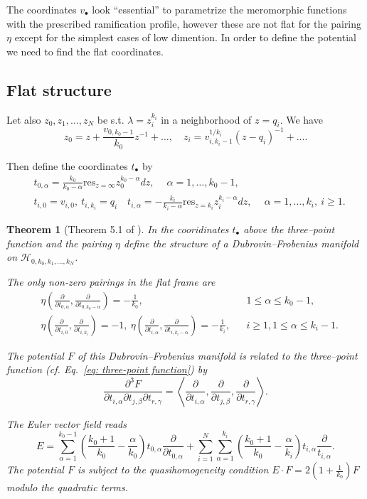 \documentclass[12pt,a4paper]{amsart}
\def\H{{\mathcal H}}
\def\res{{\mathrm{res}}}
\newcommand{\p}{{\partial}}
\newcommand{\<}{\left<}
\renewcommand{\>}{\right>}
\newtheorem{theorem}{Theorem}[section]
\numberwithin{equation}{section}
\begin{document}
The coordinates $v_\bullet$ look ``essential'' to parametrize the meromorphic functions with the prescribed ramification profile, however these are not flat for the pairing $\eta$ except for the simplest cases of low dimention. In order to define the potential we need to find the flat coordinates.

\subsection{Flat structure}\label{section: flat structure}

Let also $z_0,z_1,\dots,z_N$ be s.t. $\lambda = z_i^{k_i}$ in a neighborhood of $z = q_i$. We have
\[
  z_0 = z + \frac{v_{0,k_0-1}}{k_0} z^{-1} + \dots, \quad z_i = v_{i,k_i-1}^{1/k_i} (z - q_i)^{-1} + \dots.
\]

Then define the coordinates $t_\bullet$ by
\begin{align}
    &t_{0,\alpha} = \frac{k_0}{k_0-\alpha} \res_{z = \infty} z_0^{k_0-\alpha} dz,\
    \quad \alpha = 1,\dots,k_0-1,
    \label{eq: flat coordinates 0}
    \\
    &t_{i,0} = v_{i,0}, \ t_{i,k_i} = q_i \quad 
    t_{i,\alpha} = - \frac{k_i}{k_i-\alpha} \res_{z = k_i} z_i^{k_i-\alpha} dz,\
    \quad \alpha = 1,\dots,k_i, \ i \ge 1.
    \label{eq: flat coordinates i}
\end{align}

\begin{theorem}[Theorem 5.1 of \cite{D2}]
    In the cooridinates $t_\bullet$ above the three--point function and the pairing $\eta$ define the structure of a Dubrovin--Frobenius manifold on $\H_{0,k_0,k_1,\dots,k_N}$.
    
    The only non-zero pairings in the flat frame are
    \begin{align*}
        & \eta(\frac{\p}{\p t_{0,\alpha}},\frac{\p}{\p t_{0,k_0-\alpha}}) = -\frac{1}{k_0}, && 1 \le \alpha \le k_0-1,
        \\
        &\eta(\frac{\p}{\p t_{i,0}},\frac{\p}{\p t_{i,k_i}}) = -1, \ 
        \eta(\frac{\p}{\p t_{i,\alpha}},\frac{\p}{\p t_{i,k_i-\alpha}}) = -\frac{1}{k_i}, && i \ge 1, 1 \le \alpha \le k_i-1.
    \end{align*}
    
    The potential $F$ of this Dubrovin--Frobenius manifold is related to the three--point function (cf. Eq.~\eqref{eq: three-point function}) by
    \[
        \frac{\p^3 F}{\p t_{i,\alpha} \p t_{j,\beta} \p t_{r,\gamma}} = \left\langle \frac{\p}{\p t_{i,\alpha}},\frac{\p}{\p t_{j,\beta}},\frac{\p}{\p t_{r,\gamma}} \right \rangle.
    \]

     The Euler vector field reads
     \[
         E = \sum_{\alpha=1}^{k_0-1} 
         \left( \frac{k_0 + 1}{k_0} - \frac{\alpha}{k_0} \right)
         t_{0,\alpha} \frac{\p}{\p t_{0,\alpha}} +  \sum_{i=1}^N \sum_{\alpha=1}^{k_i}
         \left( \frac{k_0 + 1}{k_0} - \frac{\alpha}{k_i} \right) t_{i,\alpha} \frac{\p }{t_{i,\alpha}}.
     \]
     The potential $F$ is subject to the quasihomogeneity condition $E \cdot F = 2(1 + \frac{1}{k_0}) F$ modulo the quadratic terms.
         
\end{theorem}
\end{document}
